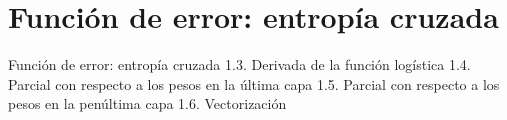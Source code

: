 \section{Función de error: entropía cruzada}
Función de error: entropía cruzada
1.3. Derivada de la función logística
1.4. Parcial con respecto a los pesos en la última capa
1.5. Parcial con respecto a los pesos en la penúltima capa
1.6. Vectorización
